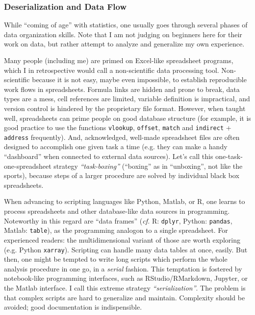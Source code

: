 \subsubsection{Deserialization and Data Flow}
\label{workflow:deserialization}
While ``coming of age'' with statistics, one usually goes through several phases of data organization skills.
Note that I am not judging on beginners here for their work on data, but rather attempt to analyze and generalize my own experience.

Many people (including me) are primed on Excel-like spreadsheet programs, which I in retrospective would call a non-scientific data processing tool.
Non-scientific because it is not easy, maybe even impossible, to establish reproducible work flows in spreadsheets.
Formula links are hidden and prone to break, data types are a mess, cell references are limited, variable definition is impractical, and version control is hindered by the proprietary file format.
However, when taught well, spreadsheets can prime people on good database structure (for example, it is good practice to use the functions \texttt{vlookup}, \texttt{offset}, \texttt{match} and \texttt{indirect} + \texttt{address} frequently).
And, acknowledged, well-made spreadsheet files are often designed to accomplish one given task a time (e.g. they can make a handy ``dashboard'' when connected to external data sources).
Let's call this one-task-one-spreadsheet strategy \emph{``task-boxing''} (``boxing'' as in ``unboxing'', not like the sports), because steps of a larger procedure are solved by individual black box spreadsheets.

When advancing to scripting languages like Python, Matlab, or R, one learns to process spreadsheets and other database-like data sources in programming.
Noteworthy in this regard are ``data frames'' (\emph{cf.} R: \texttt{dplyr}, Python: \texttt{pandas}, Matlab: \texttt{table}), as the programming analogon to a single spreadsheet.
For experienced readers: the multidimensional variant of those are worth exploring (e.g. Python \texttt{xarray}).
Scripting can handle many data tables at once, easily.
But then, one might be tempted to write long scripts which perform the whole analysis procedure in one go, in a \emph{serial} fashion.
This temptation is fostered by notebook-like programming interfaces, such as RStudio/RMarkdown, Jupyter, or the Matlab interface.
I call this extreme strategy \emph{``serialization''}.
The problem is that complex scripts are hard to generalize and maintain.
Complexity should be avoided; good documentation is indispensible.

